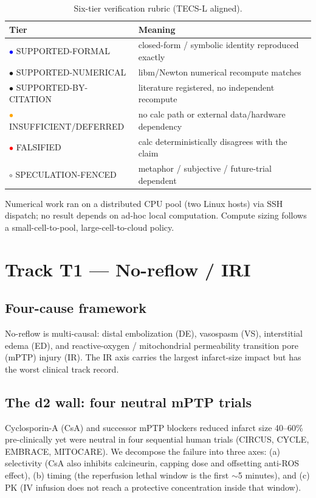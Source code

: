 \documentclass[11pt]{article}
\begin{document}
\begin{table}[h]
\centering
\caption{Six-tier verification rubric (TECS-L aligned).}
\label{tab:rubric}
\begin{tabular}{ll}
\toprule
Tier & Meaning \\
\midrule
\textcolor{blue}{$\bullet$} SUPPORTED-FORMAL & closed-form / symbolic identity reproduced exactly \\
\textcolor{green!60!black}{$\bullet$} SUPPORTED-NUMERICAL & libm/Newton numerical recompute matches \\
\textcolor{yellow!70!black}{$\bullet$} SUPPORTED-BY-CITATION & literature registered, no independent recompute \\
\textcolor{orange}{$\bullet$} INSUFFICIENT/DEFERRED & no calc path or external data/hardware dependency \\
\textcolor{red}{$\bullet$} FALSIFIED & calc deterministically disagrees with the claim \\
$\circ$ SPECULATION-FENCED & metaphor / subjective / future-trial dependent \\
\bottomrule
\end{tabular}
\end{table}

Numerical work ran on a distributed CPU pool (two Linux hosts) via SSH dispatch; no result depends on ad-hoc local computation. Compute sizing follows a small-cell-to-pool, large-cell-to-cloud policy.

\section{Track T1 --- No-reflow / IRI}
\label{sec:noreflow}

\subsection{Four-cause framework}
No-reflow is multi-causal: distal embolization (DE), vasospasm (VS), interstitial edema (ED), and reactive-oxygen / mitochondrial permeability transition pore (mPTP) injury (IR). The IR axis carries the largest infarct-size impact but has the worst clinical track record.

\subsection{The d2 wall: four neutral mPTP trials}
Cyclosporin-A (CsA) and successor mPTP blockers reduced infarct size 40--60\% pre-clinically yet were neutral in four sequential human trials (CIRCUS, CYCLE, EMBRACE, MITOCARE). We decompose the failure into three axes: (a) selectivity (CsA also inhibits calcineurin, capping dose and offsetting anti-ROS effect), (b) timing (the reperfusion lethal window is the first $\sim$5 minutes), and (c) PK (IV infusion does not reach a protective concentration inside that window).
\end{document}
